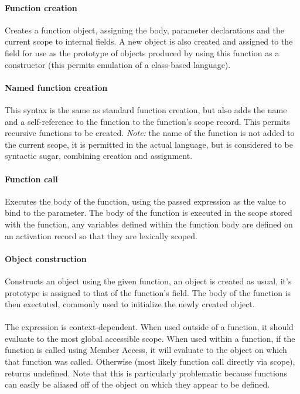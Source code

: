 \documentclass[a4paper]{article}
\begin{document}
\paragraph{Function creation} Creates a function object, assigning the body, parameter
declarations and the current scope to internal fields. A new object is also
created and assigned to the  field for use as the prototype of
objects produced by using this function as a constructor (this permits
emulation of a class-based language).

\paragraph{Named function creation} This syntax is the same as standard function creation,
but also adds the name and a self-reference to the function to the function's
scope record. This permits recursive functions to be created. \emph{Note:} the
name of the function is not added to the current scope, it is permitted in the
actual language, but is considered to be syntactic sugar, combining creation and
assignment.

\paragraph{Function call} Executes the body of the function, using the passed expression
as the value to bind to the parameter. The body of the function is executed in
the scope stored with the function, any variables defined within the function
body are defined on an activation record so that they are lexically scoped.

\paragraph{Object construction} Constructs an object using the given function, an object
is created as usual, it's prototype is assigned to that of the function's
 field. The body of the function is then exectuted, commonly used
to initialize the newly created object.

\paragraph{} The  expression is context-dependent. When used
outside of a
function, it should evaluate to the most global accessible scope.
When used within a function, if the function is called using Member Access, it
will evaluate to the object on which that function was called. Otherwise
(most likely function call directly via scope),
 returns undefined. Note that this is particularly
problematic because functions can easily be aliased off of the object on which
they appear to be defined.
\end{document}
